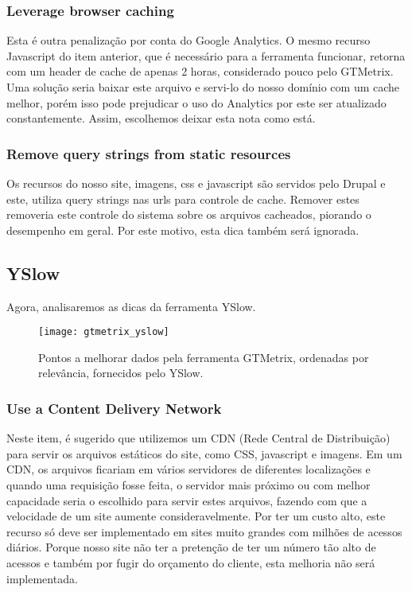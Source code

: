 \subsubsection{Leverage browser caching}
Esta é outra penalização por conta do Google Analytics. O mesmo recurso Javascript do item anterior, que é necessário para a ferramenta funcionar, retorna com um header de cache de apenas 2 horas, considerado pouco pelo GTMetrix. Uma solução seria baixar este arquivo e servi-lo do nosso domínio com um cache melhor, porém isso pode prejudicar o uso do Analytics por este ser atualizado constantemente. Assim, escolhemos deixar esta nota como está.

\subsubsection{Remove query strings from static resources}
Os recursos do nosso site, imagens, css e javascript são servidos pelo Drupal e este, utiliza query strings nas urls para controle de cache. Remover estes removeria este controle do sistema sobre os arquivos cacheados, piorando o desempenho em geral. Por este motivo, esta dica também será ignorada.

\subsection{YSlow}

Agora, analisaremos as dicas da ferramenta YSlow.

\begin{figure}[ht]
  \centering
  \texttt{[image: gtmetrix\_yslow]}
  \caption{Pontos a melhorar dados pela ferramenta GTMetrix, ordenadas por relevância, fornecidos pelo YSlow.}
  \label{gtmetrix_yslow}
\end{figure}

\subsubsection{Use a Content Delivery Network}
Neste item, é sugerido que utilizemos um CDN (Rede Central de Distribuição) para servir os arquivos estáticos do site, como CSS, javascript e imagens. Em um CDN, os arquivos ficariam em vários servidores de diferentes localizações e quando uma requisição fosse feita, o servidor mais próximo ou com melhor capacidade seria o escolhido para servir estes arquivos, fazendo com que a velocidade de um site aumente consideravelmente. Por ter um custo alto, este recurso só deve ser implementado em sites muito grandes com milhões de acessos diários. Porque nosso site não ter a pretenção de ter um número tão alto de acessos e também por fugir do orçamento do cliente, esta melhoria não será implementada.

